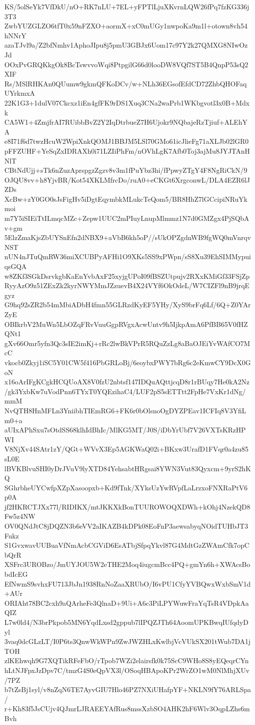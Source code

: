 KS/5olSeYk7VfDkU/nO+RK7nLU+7EL+yFPTlLjuXKvrnLQW26fPq7fzKG336j3T3
ZwbYUZGLZO6tfT0x59nFZXO+aormX+xC0mUGy1nwpoKa9m1l+otown8vh54hNNrY
azaTJvl9a/Z2bfNmhv1AphoJIpu8j5pmU3GBJx6Uom17c97Y2k27QMXG8NIwOzJd
OOxPvGRQKkgOk8BcTswvvoWqi8PtpgilG66d0looDW8VQf7ST5B4QnpP53sQ2XIF
Rs/MSlRHKAn0QUumw9gkmQFKoDCv/w+NLh36EGsofEfdCD72ZhbQHOFaqUYrkmxA
22K1G3+1dulV07Ckcxz1iEn4gfFK9rDS1Xuq3CNa2waPrb1WKbgvotl3x0B+Mdxk
CA5W1+4ZmjfrAI7RUibbBvZ2Y2IqDtrbueZ7H6Ujokr9NQbajeRzTjiuf+ALEhYA
e8I71f6d7twzHcuW2WpiXnkQOMJ1BBJM5LSl70GMo61icJlieFg71aXLJb02lGR0
pFFZUHF+YeSqZxIDRAXh0i71LZIiPhFm/nOVhLgK7Afb0Toj3ajMu8JYJTAnHNlT
CBtNdUjj+sTk6nZuzAprspgzZgzv8v3m1fPuYbz3hi/fPpwyZTgY4F8NgRiCkN/9
OJQU8vv+h8YjvBR/Kot54XKLMfrcDo/ruA0+eCKGt6XrgconwL/DLA4EZR6lJZDs
XcBw+zY0GO0sJsFigHv5iDgtEqymbkMLukcTeQom5/BR8HhZ7lGCcipiNRuYkmoi
m7Y5iSIEiTtILmqcMZc+Zepw1UUC2mPIuyLnupMlmmz1N7d0GMZgx4PjSQbAv+gm
5ElzZmaKjsZbUYSnEfn2dNBX9+aVbB6kh5oP//sUkOPZgdnWB9fgWQ0mVnrqvNST
nUN4nJTuQmRW36miXCUBPyAFHi1O9XKs5SS9xPWpn/sS8Xu39EhSIMMypuiqsGQA
w8ZKf3SGkDsrvkgbKaEnYvbAxF25xyjgUPoI09fBSZUtpujv2RXxKMiGf33FSjZp
RyyAzO9z51ZExZk2kyrNWYMmJZzuevB4X24VYf6OkOdeL/W7CIZFl9nB9jrqEgyz
G9hq92sZR2b54mMbiADbH4fmn55GLRzdKyEF5YHy/XyS9brFq6Lf/6Q+Z0YArZyE
OBIkrbV2MuWn5LbOZqFRvVuuGgpRVgxAcwUntv9h5IjkpAmA6PfBB65V0fHZQNt1
gXv66Omr5yfn3Qc3sIE2imKj+rRc2lwBkVPrR5RQuZzLg8aBaOJEiYvWAfCO7McC
vkocb0Zkyj1iSC5Y01CW5f416PbGRLoBj/6eoybxPWY7bRg6c2eKmwCY9DcX0GoN
x16oArIFgKCgkHCQUoAX8V0fzU2nbtsf147IDQuAQttjcqD8r1rBUqy7He0kA2Nz
/gk3YxbKw7uVodPnn6TYxT0YQEzihaC4/LUF2pS5sETTtt2FpHe7VxKr1dNg/mmM
NvQTH8HnMFLn3YniibhTIEmRG6+FK6r0bOlsnoOgDYZPEav1ICFIq8V3YfiLm0+a
aUIxAPhSxu7sOtdSS68klhIdBhIc/MlKG5MT/J0S/iDbYrUbf7V26VXTsKRzHPWI
V8NjXv44SAtr1zY/QGt+WVvX3Ep5AGKWaQ02i+BKxw3UrafD1FVqr0a4zu85sL0E
lBVKBlvuSHI0yDrJVuV9lyXTD84YehsabtHRgsai8YWN3Vut83Qyxcm+9yrS2hKQ
SGhrbheUYCwfpXZpXasoopxb+Kd9fTnk/XYksUzYwRVpfLaLrzxoFNXRaPtV6p0A
jf2HKRCTJXx77l/RIDIKX/mtJKKXkBonTUUROWOQXDWh+kOhj4NzekQD8Fw5z4NW
OV0QNdJtC8jDQZN3b6eVV2aIKAZB4kDPk08EoFnP3aewsabyqNOidTUHbJT3Fukz
S1GvxwavUUBuaVfNmAcbCGViD6EsATbjSfpqYkvl87G4MdtGzZWAmCfk7opCbQrR
XSFrc3UROBzo/JmUYJOU5W2eTHE2Moq4iugcmBcc4PQ+gmYn6h+XWAcsBobdIcEG
EfNwmS9svhxFU713JbJn1938RnNoZaaXRUbO/I6vPU1CfyYVBQwxWxbSmV1d+AUr
ORIAht78BC2cxh9aQArheFe3QlnaD+9Ui+A6c3PiLPYWuwFraYqTsR4VDpkAaQIZ
L7w0ld4/N3brPkpob5MN6YqdLxsd2gppub7lIPQZJTh64AoomUPKBwqIUfqdyDyl
3vaq0dcGLzLT/I0P6ts3QnwWkWPn9ZwJWZHLxKwlbjVcVUkSX201tWub7DA1jTOH
zlKEhwqh9G7XQTikRFeFbO/rTpob7WZi2elairsfk0k75ScC9WHo8S8yEQeqrCYn
hLtNJFpxJzDpv7C/tmzG4S0eQpVX3l/OSoqHBApoKPr2WrZO1wM0NlMhjXUv/7PZ
b7tZsBj1syl/v8nZqN6TE7AyvGIU7Hlo46PZ7NXiUHafpYF+NKLN9fY76ARLSpa/
r+Kh83f5JsCUjv4QJmrLJRAEEYAfRus8mssXzbSO4AHK2hF6Wlv3OqpLZhs6mBvh
